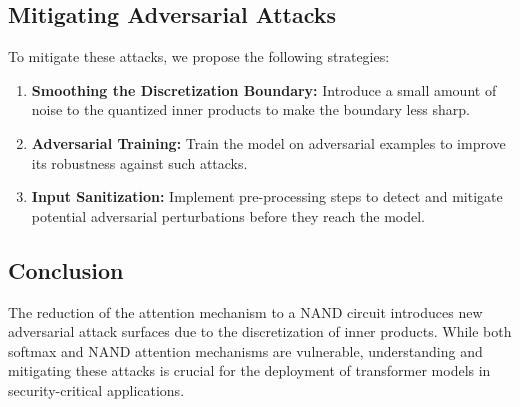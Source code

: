 \documentclass[11pt]{article}
\theoremstyle{definition}
\begin{document}
\subsection{Mitigating Adversarial Attacks}






To mitigate these attacks, we propose the following strategies:






\begin{enumerate}






    \item \textbf{Smoothing the Discretization Boundary:} Introduce a small amount of noise to the quantized inner products to make the boundary less sharp.






    \item \textbf{Adversarial Training:} Train the model on adversarial examples to improve its robustness against such attacks.






    \item \textbf{Input Sanitization:} Implement pre-processing steps to detect and mitigate potential adversarial perturbations before they reach the model.






\end{enumerate}













\subsection{Conclusion}






The reduction of the attention mechanism to a NAND circuit introduces new adversarial attack surfaces due to the discretization of inner products. While both softmax and NAND attention mechanisms are vulnerable, understanding and mitigating these attacks is crucial for the deployment of transformer models in security-critical applications.
\end{document}
